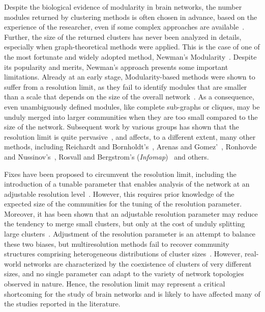 Despite the biological evidence of modularity in brain networks, the number modules returned by clustering methods is often chosen in advance, based on the experience of the researcher, even if some complex approaches are available~\cite{still2004}. Further, the size of the returned clusters has never been analyzed in details, especially when graph-theoretical methods were applied.
This is the case of one of the most fortunate and widely adopted method, Newman's Modularity~\cite{newman2006}.
Despite its popularity and merits, Newman's approach presents some important limitations. Already at an early stage, Modularity-based methods were shown to suffer from a resolution limit, as they fail to identify modules that are smaller than a scale that depends on the size of the overall network~\cite{fortunato2007}. As a consequence, even unambiguously defined modules, like complete sub-graphs or cliques, may be unduly merged into larger communities when they are too small compared to the size of the network. Subsequent work by various groups has shown that the resolution limit is quite pervasive~\cite{lancichinetti2009,traag2011,squartini2015,lancichinetti2011,kawamoto2015}, and affects, to a different extent, many other methods, including Reichardt and Bornholdt’s~\cite{reichardt2006}, Arenas and Gomez'~\cite{arenas2008}, Ronhovde and Nussinov's~\cite{ronhovde2009}, Rosvall and Bergstrom's (\emph{Infomap})~\cite{rosvall2008,kawamoto2015} and others.

Fixes have been proposed to circumvent the resolution limit, including the introduction of a tunable parameter that enables analysis of the network at an adjustable resolution level~\cite{reichardt2006,ronhovde2010,yeo2011}. However, this requires prior knowledge of the expected size of the communities for the tuning of the resolution parameter. Moreover, it has been shown that an  adjustable resolution parameter may reduce the tendency to merge small clusters, but only at the cost of unduly splitting large clusters~\cite{lancichinetti2011}. Adjustment of the resolution parameter is an attempt to balance these two biases, but multiresolution methods fail to recover community structures comprising heterogeneous distributions of cluster sizes~\cite{lancichinetti2011}. 
However, real-world networks are characterized by the coexistence of clusters of very different sizes, and no single parameter can adapt to the variety of network topologies observed in nature.
Hence, the resolution limit may represent a critical shortcoming for the study of brain networks and is likely to have affected many of the studies reported in the literature.

